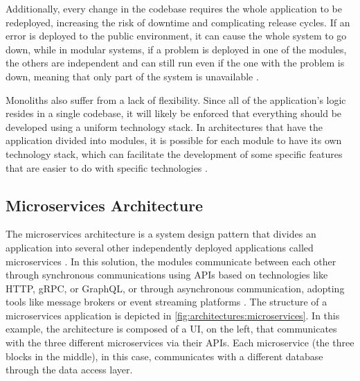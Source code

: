 Additionally, every change in the codebase requires the whole application to be
redeployed, increasing the risk of downtime and complicating release cycles. If
an error is deployed to the public environment, it can cause the whole system
to go down, while in modular systems, if a problem is deployed in one of the
modules, the others are independent and can still run even if the one with
the problem is down, meaning that only part of the system is unavailable \cite{7333476,AWSMonolithMicroservices}.

Monoliths also suffer from a lack of flexibility. Since all of the application's
logic resides in a single codebase, it will likely be enforced that everything
should be developed using a uniform technology stack. In architectures that
have the application divided into modules, it is possible for each module to have
its own technology stack, which can facilitate the development of some specific
features that are easier to do with specific technologies \cite{IBMMonolith}.
\subsection{Microservices Architecture}
The microservices architecture is a system design pattern that divides an
application into several other independently deployed applications called
microservices \cite{7436659}.
In this solution, the modules communicate between each other through
synchronous communications using \gls{API}s based on technologies like
\gls{HTTP}, \gls{gRPC}, or GraphQL, or through asynchronous communication,
adopting tools like message brokers or event streaming platforms \cite{7436659}.
The structure of a microservices application is depicted in \ref{fig:architectures:microservices}.
In this example, the architecture is composed of a \gls{UI}, on the left,
that communicates with the three different microservices via their \gls{API}s.
Each microservice (the three blocks in the middle), in this case, communicates
with a different database through the data access layer.

